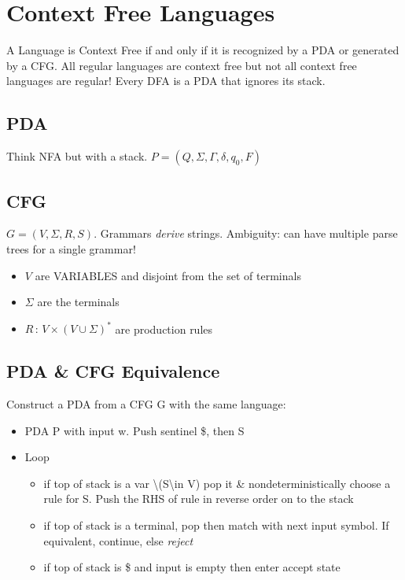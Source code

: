 \section{Context Free Languages}
\label{contextfreelanguages}

A Language is Context Free if and only if it is recognized by a PDA or generated by a CFG. All regular languages are context free but not all context free languages are regular! Every DFA is a PDA that ignores its stack.

\subsection{PDA}
\label{pda}

Think NFA but with a stack. $P = (Q, \Sigma, \Gamma, \delta, q_0, F)$

\subsection{CFG}
\label{cfg}

$ G = (V, \Sigma, R, S) $. Grammars \emph{derive} strings. Ambiguity: can have multiple parse trees for a single grammar!

\begin{itemize}
\item $V$ are VARIABLES and disjoint from the set of terminals

\item $\Sigma$ are the terminals

\item $R\, :\, V \times (V \cup \Sigma)^*$ are production rules

\end{itemize}

\subsection{PDA \& CFG Equivalence}
\label{pdacfgequivalence}

Construct a PDA from a CFG G with the same language:

\begin{itemize}
\item PDA P with input w. Push sentinel \$, then S

\item Loop

\begin{itemize}
\item if top of stack is a var \textbackslash{}(S\textbackslash{}in V) pop it \& nondeterministically choose a rule for S. Push the RHS of rule in reverse order on to the stack

\item if top of stack is a terminal, pop then match with next input symbol. If equivalent, continue, else \emph{reject}

\item if top of stack is \$ and input is empty then enter accept state

\end{itemize}

\end{itemize}

